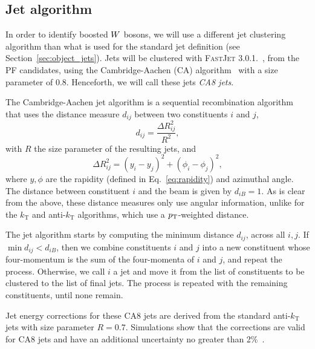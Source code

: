 \subsection{Jet algorithm}

In order to identify boosted $W$ bosons,  we will use a different jet clustering algorithm
than what is used for the standard jet definition (see Section~\ref{sec:object_jets}). 
Jets will be clustered with \textsc{FastJet 3.0.1.}~\cite{Cacciari:2011ma}, from the PF candidates,
using the Cambridge-Aachen (CA) algorithm~\cite{Dokshitzer:1997in} with a size parameter of 0.8.
Henceforth, we will call these jets \textit{CA8 jets}. 

\begin{cajet} \theoremstyle{definition}
The Cambridge-Aachen jet algorithm is a sequential recombination algorithm that uses the
distance measure $d_{ij}$ between two constituents $i$ and $j$,
\begin{equation}
d_{ij} = \frac{\Delta R_{ij}^2}{R^2}, \label{eq:CA_distance}
\end{equation}
with $R$ the size parameter of the resulting jets, and
\begin{equation}
\Delta R_{ij}^2 = (y_i - y_j)^2 + (\phi_i - \phi_j)^2 ,
\label{eq:DeltaR_jet_algo}
\end{equation}
where $y, \phi$ are the rapidity (defined in Eq.~\ref{eq:rapidity}) and azimuthal angle. 
The distance between constituent $i$ and the beam is given by $d_{iB} = 1$.
As is clear from the above, these distance measures only use angular information, unlike for the
$k_\mathrm{T}$ and anti-$k_\mathrm{T}$ algorithms, which use a $p_{\mathrm{T}}$-weighted distance. 

The jet algorithm starts by computing the minimum distance $d_{ij}$, across all $i,j$. If $\min
d_{ij} < d_{iB}$, then we combine constituents $i$ and $j$ into a new constituent whose
four-momentum is the sum of the four-momenta of $i$ and $j$, and repeat the process. Otherwise, we
call $i$ a jet and move it from the list of constituents to be clustered to the list of final jets.
The process is repeated with the remaining constituents, until none remain.
\end{cajet}


Jet energy corrections for these CA8 jets are derived from the standard anti-$k_\textrm{T}$ jets
with size parameter $R=0.7$. Simulations show that the corrections are valid for CA8 jets and
have an additional uncertainty no greater than 2\%~\cite{CMS-PAS-JME-13-007,CMS-AN2012-393}.  

